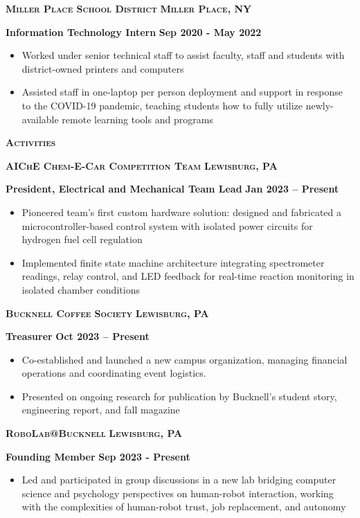 \documentclass{article}
\newlength{\sectspaceabove}
\newlength{\sectspacebelow}
\newcommand{\textscbf}[1]{\textbf{\textsc{#1}}}
\newcommand{\resumesection}[1]{%
    \vspace{\sectspaceabove}%
    \begin{center}
        \textscbf{#1}
    \end{center}%
    \vspace{\sectspacebelow}%
}
\begin{document}
\textscbf{Miller Place School District} \hfill \textscbf{Miller Place, NY}

\textbf{Information Technology Intern} \hfill \textbf{Sep 2020 - May 2022}
\begin{itemize}[noitemsep,topsep=2pt]
	\item Worked under senior technical staff to assist faculty, staff and students with district-owned printers and computers
	\item Assisted staff in one-laptop per person deployment and support in response to the COVID-19 pandemic, teaching students how to fully utilize newly-available remote learning tools and programs
\end{itemize}


\resumesection{Activities}

\textscbf{AIChE Chem-E-Car Competition Team} \hfill \textscbf{Lewisburg, PA}

\textbf{President, Electrical and Mechanical Team Lead} \hfill \textbf{Jan 2023 – Present}
\begin{itemize}[noitemsep,topsep=2pt]
	\item Pioneered team's first custom hardware solution: designed and fabricated a microcontroller-based control system with isolated power circuits for hydrogen fuel cell regulation
    \item Implemented finite state machine architecture integrating spectrometer readings, relay control, and LED feedback for real-time reaction monitoring in isolated chamber conditions
\end{itemize}

\textscbf{Bucknell Coffee Society} \hfill \textscbf{Lewisburg, PA}

\textbf{Treasurer} \hfill \textbf{Oct 2023 – Present}
\begin{itemize}[noitemsep,topsep=2pt]
    \item Co-established and launched a new campus organization, managing financial operations and coordinating event logistics.
    \item Presented on ongoing research for publication by Bucknell's student story, engineering report, and fall magazine
\end{itemize}

\textscbf{RoboLab@Bucknell} \hfill \textscbf{Lewisburg, PA}

\textbf{Founding Member} \hfill \textbf{Sep 2023 - Present}
\begin{itemize}[noitemsep,topsep=2pt]
	\item Led and participated in group discussions in a new lab bridging computer science and psychology perspectives on human-robot interaction, working with the complexities of human-robot trust, job replacement, and autonomy
\end{itemize}
\end{document}
